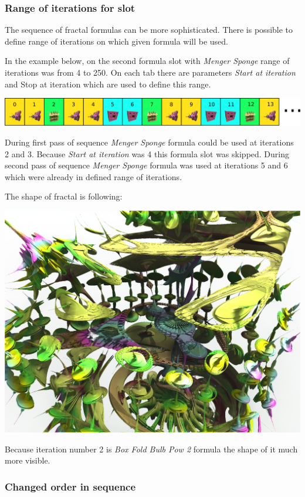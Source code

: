 \subsubsection{Range of iterations for slot}

The sequence of fractal formulas can be more sophisticated. There is possible to define range of iterations on which given formula will be used.

In the example below, on the second formula slot with \emph{Menger Sponge} range of iterations was from 4 to 250. On each tab there are parameters \emph{Start at iteration} and {Stop at iteration} which are used to define this range.

\includegraphics[width=\linewidth]{img/manual/media/iteration_loop_hybrid_sequence_4.png}

During first pass of sequence \emph{Menger Sponge} formula could be used at iterations 2 and 3. Because \emph{Start at iteration} was 4 this formula slot was skipped. During second pass of sequence \emph{Menger Sponge} formula was used at iterations 5 and 6 which were already in defined range of iterations.

The shape of fractal is following:\nopagebreak

\includegraphics[width=0.7\linewidth]{img/manual/media/hybrid_sequence_example_4.png}

Because iteration number 2 is \emph{Box Fold Bulb Pow 2} formula the shape of it much more visible.

\subsubsection{Changed order in sequence}

